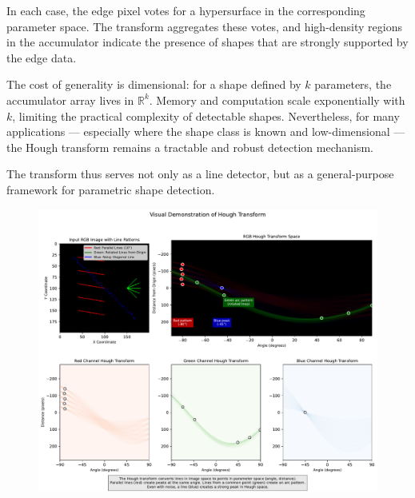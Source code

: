 In each case, the edge pixel votes for a hypersurface in the corresponding parameter space. The transform aggregates these votes, and high-density regions in the accumulator indicate the presence of shapes that are strongly supported by the edge data.

The cost of generality is dimensional: for a shape defined by $k$ parameters, the accumulator array lives in $\mathbb{R}^k$. Memory and computation scale exponentially with $k$, limiting the practical complexity of detectable shapes. Nevertheless, for many applications — especially where the shape class is known and low-dimensional — the Hough transform remains a tractable and robust detection mechanism.

The transform thus serves not only as a line detector, but as a general-purpose framework for parametric shape detection.


\begin{figure}[ht]
  \centering
  \includegraphics[width=1\textwidth]{41_HoughTransfrom/hough_transform_visualization.pdf}
  \label{fig:permgraph3}
\end{figure}